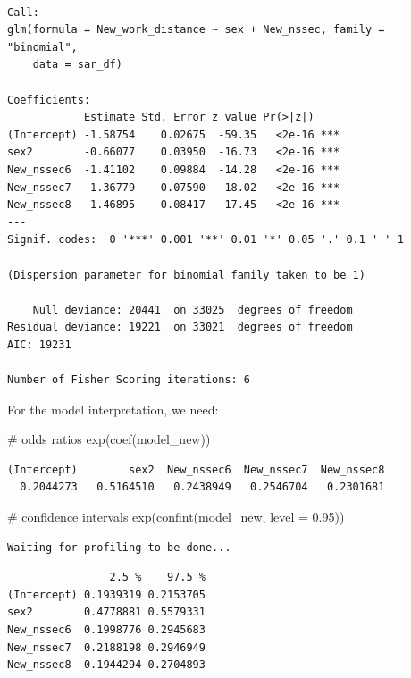 \documentclass[
  letterpaper,
  DIV=11,
  numbers=noendperiod]{scrreprt}
\newenvironment{Shaded}{\begin{snugshade}}{\end{snugshade}}
\newcommand{\AttributeTok}[1]{\textcolor[rgb]{0.40,0.45,0.13}{#1}}
\newcommand{\CommentTok}[1]{\textcolor[rgb]{0.37,0.37,0.37}{#1}}
\newcommand{\FloatTok}[1]{\textcolor[rgb]{0.68,0.00,0.00}{#1}}
\newcommand{\FunctionTok}[1]{\textcolor[rgb]{0.28,0.35,0.67}{#1}}
\newcommand{\NormalTok}[1]{\textcolor[rgb]{0.00,0.23,0.31}{#1}}
\begin{document}
\begin{verbatim}

Call:
glm(formula = New_work_distance ~ sex + New_nssec, family = "binomial", 
    data = sar_df)

Coefficients:
            Estimate Std. Error z value Pr(>|z|)    
(Intercept) -1.58754    0.02675  -59.35   <2e-16 ***
sex2        -0.66077    0.03950  -16.73   <2e-16 ***
New_nssec6  -1.41102    0.09884  -14.28   <2e-16 ***
New_nssec7  -1.36779    0.07590  -18.02   <2e-16 ***
New_nssec8  -1.46895    0.08417  -17.45   <2e-16 ***
---
Signif. codes:  0 '***' 0.001 '**' 0.01 '*' 0.05 '.' 0.1 ' ' 1

(Dispersion parameter for binomial family taken to be 1)

    Null deviance: 20441  on 33025  degrees of freedom
Residual deviance: 19221  on 33021  degrees of freedom
AIC: 19231

Number of Fisher Scoring iterations: 6
\end{verbatim}

For the model interpretation, we need:

\begin{Shaded}
\begin{Highlighting}[]
\CommentTok{\# odds ratios}
\FunctionTok{exp}\NormalTok{(}\FunctionTok{coef}\NormalTok{(model\_new)) }
\end{Highlighting}
\end{Shaded}

\begin{verbatim}
(Intercept)        sex2  New_nssec6  New_nssec7  New_nssec8 
  0.2044273   0.5164510   0.2438949   0.2546704   0.2301681 
\end{verbatim}

\begin{Shaded}
\begin{Highlighting}[]
\CommentTok{\# confidence intervals}
\FunctionTok{exp}\NormalTok{(}\FunctionTok{confint}\NormalTok{(model\_new, }\AttributeTok{level =} \FloatTok{0.95}\NormalTok{)) }
\end{Highlighting}
\end{Shaded}

\begin{verbatim}
Waiting for profiling to be done...
\end{verbatim}

\begin{verbatim}
                2.5 %    97.5 %
(Intercept) 0.1939319 0.2153705
sex2        0.4778881 0.5579331
New_nssec6  0.1998776 0.2945683
New_nssec7  0.2188198 0.2946949
New_nssec8  0.1944294 0.2704893
\end{verbatim}
\end{document}
